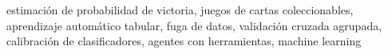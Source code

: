 \documentclass[conference]{IEEEtran}
\begin{document}
\begin{IEEEkeywords}
estimación de probabilidad de victoria, juegos de cartas coleccionables,
aprendizaje automático tabular, fuga de datos, validación cruzada agrupada,
calibración de clasificadores, agentes con herramientas, machine learning
\end{IEEEkeywords}




\end{document}
